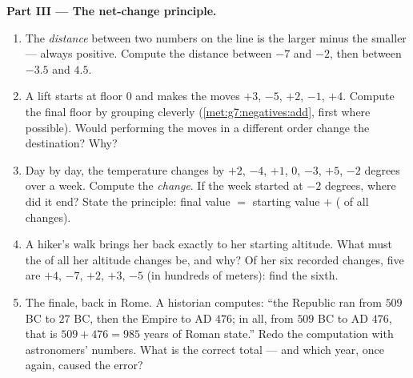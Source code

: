 \begin{problem}
\medskip
\noindent\textbf{Part III --- The net-change principle.}
\begin{enumerate}[resume]
  \item The \emph{distance} between two numbers on the line is
        the larger minus the smaller --- always positive.
        Compute the distance between $-7$ and $-2$, then between
        $-3.5$ and $4.5$.
  \item A lift starts at floor $0$ and makes the moves $+3$,
        $-5$, $+2$, $-1$, $+4$. Compute the final floor by
        grouping cleverly (\cref{met:g7:negatives:add},
         first where possible). Would performing the
        moves in a different order change the destination? Why?
  \item Day by day, the temperature changes by $+2$, $-4$, $+1$,
        $0$, $-3$, $+5$, $-2$ degrees over a week. Compute the
        \emph{ change}. If the week started at $-2$ degrees,
        where did it end? State the principle: final value $=$
        starting value $+$ ( of all changes).
  \item A hiker's walk brings her back exactly to her starting
        altitude. What must the  of all her altitude changes
        be, and why? Of her six recorded changes, five are
        $+4$, $-7$, $+2$, $+3$, $-5$ (in hundreds of meters):
        find the sixth.
  \item The finale, back in Rome. A historian computes: ``the
        Republic ran from $509$ BC to $27$ BC, then the Empire
        to AD $476$; in all, from $509$ BC to AD $476$, that is
        $509 + 476 = 985$ years of Roman state.'' Redo the
        computation with astronomers' numbers. What is the
        correct total --- and which year, once again, caused the
        error?
\end{enumerate}
\end{problem}
